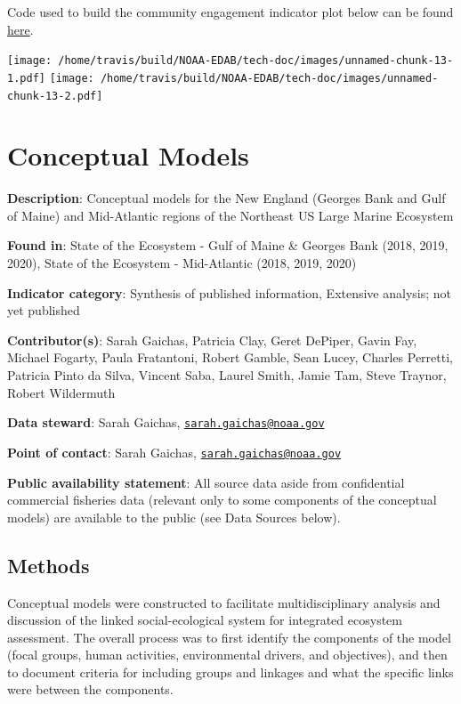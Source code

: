 \documentclass[
]{book}
\begin{document}
Code used to build the community engagement indicator plot below can be found \href{https://github.com/NOAA-EDAB/ecodata/blob/master/chunk-scripts/LTL.Rmd-MAB-comm-eng.R}{here}.

\texttt{[image: /home/travis/build/NOAA-EDAB/tech-doc/images/unnamed-chunk-13-1.pdf]} \texttt{[image: /home/travis/build/NOAA-EDAB/tech-doc/images/unnamed-chunk-13-2.pdf]}

\hypertarget{conceptual-models}{%
\chapter{Conceptual Models}\label{conceptual-models}}

\textbf{Description}: Conceptual models for the New England (Georges Bank and Gulf of Maine) and Mid-Atlantic regions of the Northeast US Large Marine Ecosystem

\textbf{Found in}: State of the Ecosystem - Gulf of Maine \& Georges Bank (2018, 2019, 2020), State of the Ecosystem - Mid-Atlantic (2018, 2019, 2020)

\textbf{Indicator category}: Synthesis of published information, Extensive analysis; not yet published

\textbf{Contributor(s)}: Sarah Gaichas, Patricia Clay, Geret DePiper, Gavin Fay, Michael Fogarty, Paula Fratantoni, Robert Gamble, Sean Lucey, Charles Perretti, Patricia Pinto da Silva, Vincent Saba, Laurel Smith, Jamie Tam, Steve Traynor, Robert Wildermuth

\textbf{Data steward}: Sarah Gaichas, \href{mailto:sarah.gaichas@noaa.gov}{\nolinkurl{sarah.gaichas@noaa.gov}}

\textbf{Point of contact}: Sarah Gaichas, \href{mailto:sarah.gaichas@noaa.gov}{\nolinkurl{sarah.gaichas@noaa.gov}}

\textbf{Public availability statement}: All source data aside from confidential commercial fisheries data (relevant only to some components of the conceptual models) are available to the public (see Data Sources below).

\hypertarget{methods-12}{%
\section{Methods}\label{methods-12}}

Conceptual models were constructed to facilitate multidisciplinary analysis and discussion of the linked social-ecological system for integrated ecosystem assessment. The overall process was to first identify the components of the model (focal groups, human activities, environmental drivers, and objectives), and then to document criteria for including groups and linkages and what the specific links were between the components.
\end{document}

